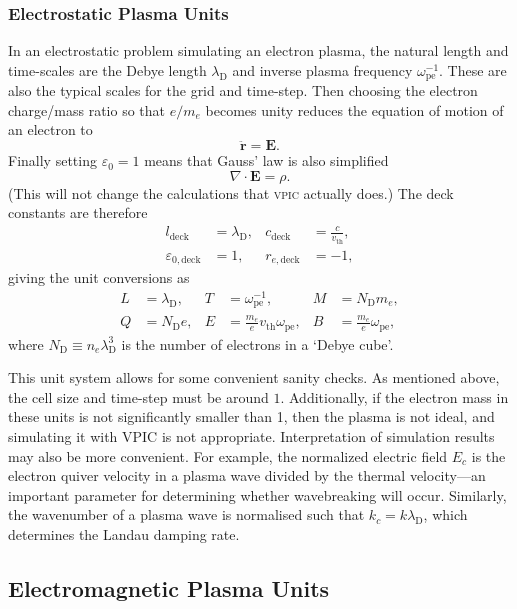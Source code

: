 \documentclass[twocolumn,10pt]{article}
\renewcommand{\vec}[1]{\mathbf{#1}}
\newcommand{\omegap}{\omega_{\mathrm{pe}}}
\newcommand{\vth}{v_{\mathrm{th}}}
\newcommand{\ldebye}{\lambda_{\mathrm{D}}}
\begin{document}
	\subsubsection{Electrostatic Plasma Units}

	In an electrostatic problem simulating an electron plasma, the natural length and time-scales are the Debye length $\ldebye$ and inverse plasma frequency $\omegap^{-1}$. These are also the typical scales for the grid and time-step. Then choosing the electron charge/mass ratio so that $e/m_e$ becomes unity reduces the equation of motion of an electron to
	\begin{equation*}
		\ddot{\vec{r}} = \vec{E}.
	\end{equation*}
	Finally setting $\varepsilon_0=1$ means that Gauss' law is also simplified
	\begin{equation*}
		\nabla \cdot \vec{E} = \rho.
	\end{equation*}
    (This will not change the calculations that \textsc{vpic} actually does.)
	The deck constants are therefore
	\begin{align*}
		l_{\mathrm{deck}} &= \ldebye, &
		c_{\mathrm{deck}} &= \frac{c}{\vth}, \\
		\varepsilon_{0,\mathrm{deck}} &= 1, &
		r_{e,\mathrm{deck}} &= -1,
	\end{align*}
	giving the unit conversions as
	\begin{align*}
		L &= \ldebye, &
		T &= \omegap^{-1}, &
		M &= N_{\mathrm{D}}m_e, \\
		Q &= N_{\mathrm{D}}e, &
		E &= \frac{m_e}{e}\vth\omegap, &
		B &= \frac{m_e}{e}\omegap,
	\end{align*}
	where $N_{\mathrm{D}} \equiv n_e\ldebye^3$ is the number of electrons in a `Debye cube'.

	This unit system allows for some convenient sanity checks. As mentioned above, the cell size and time-step must be around $1$. Additionally, if the electron mass in these units is not significantly smaller than 1, then the plasma is not ideal, and simulating it with VPIC is not appropriate. Interpretation of simulation results may also be more convenient. For example, the normalized electric field $E_c$ is the electron quiver velocity in a plasma wave divided by the thermal velocity---an important parameter for determining whether wavebreaking will occur. Similarly, the wavenumber of a plasma wave is normalised such that $k_c = k\ldebye$, which determines the Landau damping rate.

	\subsection{Electromagnetic Plasma Units}
\end{document}
